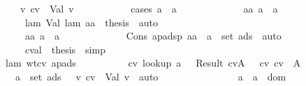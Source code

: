 \begin{isabellebody}
\ \ \ \ \ \ \ \ \ \ \isamarkupfalse \ {\isachardoublequoteopen}{\isasymexists}\ v{\isachardot}\ cv{\isacharprime}\ {\isacharequal}\ Val\ v{\isachardoublequoteclose}\isanewline
\ \ \ \ \ \ \ \ \ \ \isamarkupfalse \ {\isacharparenleft}cases\ {\isachardoublequoteopen}a{\isacharprime}\ {\isacharequal}\ a{\isachardoublequoteclose}{\isacharparenright}\isanewline
\ \ \ \ \ \ \ \ \ \ \ \ \isamarkupfalse \ aa{\isacharcolon}\ {\isachardoublequoteopen}a{\isacharprime}\ {\isacharequal}\ a{\isachardoublequoteclose}\isanewline
\ \ \ \ \ \ \ \ \ \ \ \ \isamarkupfalse \ lam{}\ Val\ lam\ aa\ \isamarkupfalse \ {\isacharquery}thesis\ \isamarkupfalse \ auto\ \isamarkupfalse \isanewline
\ \ \ \ \ \ \ \ \ \ \isamarkupfalse \isanewline
\ \ \ \ \ \ \ \ \ \ \ \ \isamarkupfalse \ aa{\isacharcolon}\ {\isachardoublequoteopen}a{\isacharprime}\ {\isasymnoteq}\ a{\isachardoublequoteclose}\isanewline
\ \ \ \ \ \ \ \ \ \ \ \ \isamarkupfalse \ Cons\ ap{\isacharunderscore}adsp\ aa\ \isamarkupfalse \ {\isachardoublequoteopen}a{\isacharprime}\ {\isasymnotin}\ set\ ads{\isachardoublequoteclose}\ \isamarkupfalse \ auto\ \isamarkupfalse \isanewline
\ \ \ \ \ \ \ \ \ \ \ \ \isamarkupfalse \ cval{}\ \isamarkupfalse \ {\isacharquery}thesis\ \isamarkupfalse \ simp\isanewline
\ \ \ \ \ \ \ \ \ \ \isamarkupfalse \isanewline
\ \ \ \ \ \ \ \ \isamarkupfalse \isanewline
\ \ \ \ \ \ \ \ \isamarkupfalse \ lam{}\ wtcv{}\ ap{\isacharunderscore}ads\isanewline
\ \ \ \ \ \ \ \ \isamarkupfalse \ {\isachardoublequoteopen}{\isasymexists}\ cv{\isachardot}\ lookup\ a{\isacharprime}\ {\isasymmu}\ {\isacharequal}\ Result\ {\isacharparenleft}cv{\isacharcomma}A{\isacharprime}{\isacharparenright}\ {\isasymand}\ {\isasymSigma}\ {\isasymturnstile}cv\ cv\ {\isacharcolon}\ A{\isacharprime}\isanewline
\ \ \ \ \ \ \ \ \ \ {\isasymand}\ {\isacharparenleft}a{\isacharprime}\ {\isasymnotin}\ set\ ads{\isacharprime}\ {\isasymlongrightarrow}\ {\isacharparenleft}{\isasymexists}\ v{\isachardot}\ cv\ {\isacharequal}\ Val\ v{\isacharparenright}{\isacharparenright}{\isachardoublequoteclose}\ \isamarkupfalse \ auto\isanewline
\ \ \ \ \ \ \isamarkupfalse \isanewline
\ \ \ \ \ \ \ \ \isamarkupfalse \ a\ \isamarkupfalse \ {\isachardoublequoteopen}a\ {\isasymin}\ dom\ {\isasymmu}{\isachardoublequoteclose}\isanewline

\end{isabellebody}
